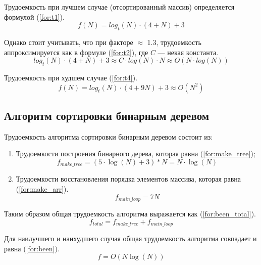 Трудоемкость при лучшем случае (отсортированный массив) определяется формулой (\ref{for:t1}).
\begin{equation}
	\label{for:t1}
	f(N) = log_t(N) \cdot (4 + N) + 3
\end{equation}

Однако стоит учитывать, что при факторе $\approx$ 1.3, трудоемкость аппроксимируется как в формуле (\ref{for:t2}), где $C$ --- некая константа. 
\begin{equation}
	\label{for:t2}
	log_t(N) \cdot (4 + N) + 3 \approx C \cdot log(N) \cdot N \approx O(N \cdot log(N))
\end{equation}

Трудоемкость при худшем случае (\ref{for:t4}).
\begin{equation}
	\label{for:t4}
	f(N) =log_t(N) \cdot (4 + 9N) + 3 \approx O(N^2)
\end{equation}

\subsection{Алгоритм сортировки бинарным деревом}

Трудоемкость алгоритма сортировки бинарным деревом состоит из:
\begin{enumerate}[label=\arabic*)]
	\item Трудоемкости построения бинарного дерева, которая равна (\ref{for:make_tree});
	\begin{equation}
		\label{for:make_tree}
		f_{make\_tree} = (5 \cdot \log(N) + 3) * N = N \cdot \log(N)
	\end{equation}
	\item Трудоемкости восстановления порядка элементов массива, которая равна (\ref{for:make_arr}).
	\begin{equation}
		\label{for:make_arr}
		f_{main\_loop} = 7 N
	\end{equation}
\end{enumerate}

Таким образом общая трудоемкость алгоритма выражается как (\ref{for:been_total}).
\begin{equation}
	\label{for:been_total}
	f_{total} = f_{make\_tree} + f_{main\_loop}
\end{equation}


Для наилучшего и наихудшего случая общая трудоемкость алгоритма совпадает и равна (\ref{for:been}).
\begin{equation}
	\label{for:been}
	f = O(N\log(N))
\end{equation}



